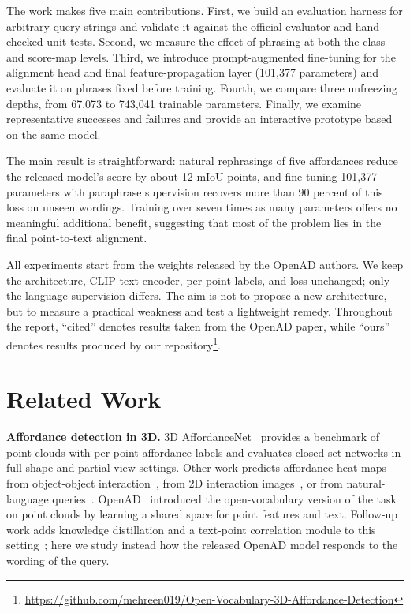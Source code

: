 \documentclass[conference]{IEEEtran}
\begin{document}
The work makes five main contributions. First, we build an evaluation harness for arbitrary query strings and validate it against the official evaluator and hand-checked unit tests. Second, we measure the effect of phrasing at both the class and score-map levels. Third, we introduce prompt-augmented fine-tuning for the alignment head and final feature-propagation layer (101,377 parameters) and evaluate it on phrases fixed before training. Fourth, we compare three unfreezing depths, from 67,073 to 743,041 trainable parameters. Finally, we examine representative successes and failures and provide an interactive prototype based on the same model.

The main result is straightforward: natural rephrasings of five affordances reduce the released model's score by about 12 mIoU points, and fine-tuning 101,377 parameters with paraphrase supervision recovers more than 90 percent of this loss on unseen wordings. Training over seven times as many parameters offers no meaningful additional benefit, suggesting that most of the problem lies in the final point-to-text alignment.

All experiments start from the weights released by the OpenAD authors. We keep the architecture, CLIP text encoder, per-point labels, and loss unchanged; only the language supervision differs. The aim is not to propose a new architecture, but to measure a practical weakness and test a lightweight remedy. Throughout the report, ``cited'' denotes results taken from the OpenAD paper, while ``ours'' denotes results produced by our repository\footnote{\url{https://github.com/mehreen019/Open-Vocabulary-3D-Affordance-Detection}}.

\section{Related Work}
\label{sec:related}

\textbf{Affordance detection in 3D.} 3D AffordanceNet~\cite{affordancenet} provides a benchmark of point clouds with per-point affordance labels and evaluates closed-set networks in full-shape and partial-view settings. Other work predicts affordance heat maps from object-object interaction~\cite{o2oafford}, from 2D interaction images~\cite{iagnet}, or from natural-language queries~\cite{laso}. OpenAD~\cite{openad} introduced the open-vocabulary version of the task on point clouds by learning a shared space for point features and text. Follow-up work adds knowledge distillation and a text-point correlation module to this setting~\cite{vo2024}; here we study instead how the released OpenAD model responds to the wording of the query.
\end{document}
